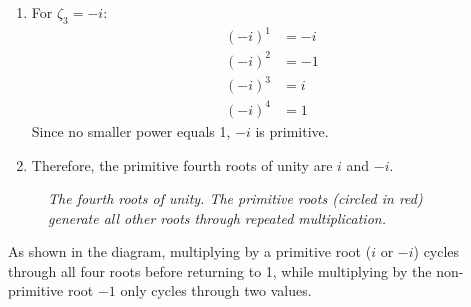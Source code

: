 \begin{example}
\begin{solution}
\begin{enumerate}
\item For $\zeta_3 = -i$:
  \begin{align*}
  (-i)^1 &= -i \\
  (-i)^2 &= -1 \\
  (-i)^3 &= i \\
  (-i)^4 &= 1
  \end{align*}
  Since no smaller power equals 1, $-i$ is primitive.

\item Therefore, the primitive fourth roots of unity are $i$ and $-i$.

\end{enumerate}

\begin{figure}[H]
\centering
{}
\caption{\textit{The fourth roots of unity. The primitive roots (circled in red) generate all other roots through repeated multiplication.}}
\end{figure}

\noindent As shown in the diagram, multiplying by a primitive root ($i$ or $-i$) cycles through all four roots before returning to 1, while multiplying by the non-primitive root $-1$ only cycles through two values.
\end{solution}
\end{example}
\exampleline

